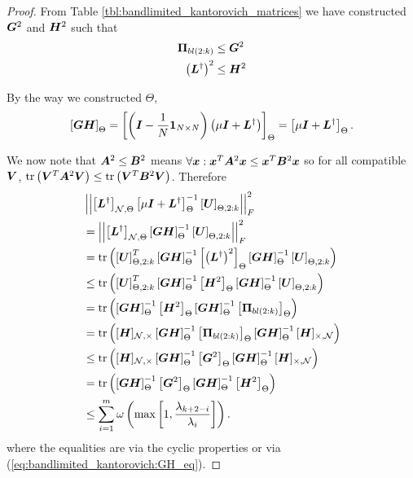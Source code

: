\begin{proof}
From Table \ref{tbl:bandlimited_kantorovich_matrices} we have constructed $\bm{G}^{2}$ and $\bm{H}^{2}$ such that
\begin{align}
    \projgen{bl(2:k)} &\leq \matr{G}^{2} \\
    \left(\matr{L}^{\dagger}\right)^{2} &\leq \matr{H}^{2}
\end{align}

By the way we constructed ${\Theta}$,
    \begin{equation}
        \msubgen[\Theta]{\matr{G}\matr{H}} = \msubgen[\Theta]{\left(\matr{I} - \frac{1}{N}\vect{1}_{N\times N}\right)\left(\mu\matr{I} + \matr{L}^{\dagger} \right)} = \msubgen[\Theta]{\mu\matr{I} + \matr{L}^{\dagger} }. \label{eq:bandlimited_kantorovich:GH_eq}
    \end{equation}

We now note that $\bm{A}^{2} \leq \bm{B}^{2}$ means $\forall \bm{x}: \bm{x}^{T}\bm{A}^{2}\bm{x} \leq \bm{x}^{T}\bm{B}^{2}\bm{x}$ so  for all compatible $\bm{V}$, $\textrm{tr}\left(\bm{V}^{T}\bm{A}^{2}\bm{V}\right) \leq \textrm{tr}\left(\bm{V}^{T}\bm{B}^{2}\bm{V}\right)$. Therefore
\begin{align}
    &\sqfrob{\msubgen[\set{N}, \Theta]{\matr{L}^{\dagger}}\msubgen[\Theta]{\mu\matr{I} + \matr{L}^{\dagger}}^{-1}\msubgen[\Theta, 2:k]{\matr{U}}} \\
    &=\sqfrob{\msubgen[\set{N}, \Theta]{\matr{L}^{\dagger}}\msubgen[\Theta]{\matr{G}\matr{H}}^{-1}\msubgen[\Theta, 2:k]{\matr{U}}} \\
    &= \trace{\msubgen[\Theta, 2:k]{\matr{U}}^{T}\msubgen[\Theta]{\matr{G}\matr{H}}^{-1}\msubgen[ \Theta]{\left(\matr{L}^{\dagger}\right)^{2}}\msubgen[\Theta]{\matr{G}\matr{H}}^{-1}\msubgen[\Theta, 2:k]{\matr{U}}} \\
    &\leq \trace{\msubgen[\Theta, 2:k]{\matr{U}}^{T}\msubgen[\Theta]{\matr{G}\matr{H}}^{-1}\msubgen[ \Theta]{\matr{H}^{2}}\msubgen[\Theta]{\matr{G}\matr{H}}^{-1}\msubgen[\Theta, 2:k]{\matr{U}}} \\
    &= \trace{\msubgen[\Theta]{\matr{G}\matr{H}}^{-1}\msubgen[ \Theta]{\matr{H}^{2}}\msubgen[\Theta]{\matr{G}\matr{H}}^{-1}\msubgen[\Theta]{\projgen{bl(2:k)}}} \\
    &= \trace{\matrsub[N,\Theta]{H}\msubgen[\Theta]{\matr{G}\matr{H}}^{-1}\msubgen[\Theta]{\projgen{bl(2:k)}} \msubgen[\Theta]{\matr{G}\matr{H}}^{-1}\matrsub[\Theta,N]{H} } \\
    &\leq \trace{\matrsub[N,\Theta]{H}\msubgen[\Theta]{\matr{G}\matr{H}}^{-1}\msubgen[\Theta]{\matr{G}^{2}} \msubgen[\Theta]{\matr{G}\matr{H}}^{-1}\matrsub[\Theta,N]{H} } \\
    &= \trace{\msubgen[\Theta]{\matr{G}\matr{H}}^{-1}\msubgen[\Theta]{\matr{G}^{2}} \msubgen[\Theta]{\matr{G}\matr{H}}^{-1}\msubgen[\Theta]{\matr{H}^{2}} } \\
    &\leq \sum^{m}_{i=1}\omega\left(\max\left[1,\frac{\lambda_{k+2-i}}{\lambda_{i}}\right]\right).
\end{align}
where the equalities are via the cyclic properties or via (\ref{eq:bandlimited_kantorovich:GH_eq}).


\end{proof}
